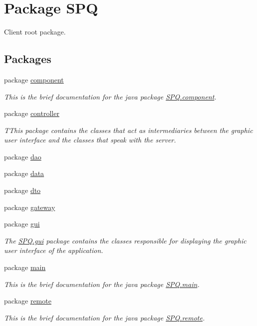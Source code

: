 \hypertarget{namespace_s_p_q}{}\section{Package S\+PQ}
\label{namespace_s_p_q}


Client root package.  


\subsection*{Packages}
\begin{DoxyCompactItemize}
\item 
package \mbox{\hyperlink{namespace_s_p_q_1_1component}{component}}
\begin{DoxyCompactList}\small\item\em This is the brief documentation for the java package \mbox{\hyperlink{namespace_s_p_q_1_1component}{S\+P\+Q.\+component}}. \end{DoxyCompactList}\item 
package \mbox{\hyperlink{namespace_s_p_q_1_1controller}{controller}}
\begin{DoxyCompactList}\small\item\em T\+This package contains the classes that act as intermediaries between the graphic user interface and the classes that speak with the server. \end{DoxyCompactList}\item 
package \mbox{\hyperlink{namespace_s_p_q_1_1dao}{dao}}
\item 
package \mbox{\hyperlink{namespace_s_p_q_1_1data}{data}}
\item 
package \mbox{\hyperlink{namespace_s_p_q_1_1dto}{dto}}
\item 
package \mbox{\hyperlink{namespace_s_p_q_1_1gateway}{gateway}}
\item 
package \mbox{\hyperlink{namespace_s_p_q_1_1gui}{gui}}
\begin{DoxyCompactList}\small\item\em The \mbox{\hyperlink{namespace_s_p_q_1_1gui}{S\+P\+Q.\+gui}} package contains the classes responsible for displaying the graphic user interface of the application. \end{DoxyCompactList}\item 
package \mbox{\hyperlink{namespace_s_p_q_1_1main}{main}}
\begin{DoxyCompactList}\small\item\em This is the brief documentation for the java package \mbox{\hyperlink{namespace_s_p_q_1_1main}{S\+P\+Q.\+main}}. \end{DoxyCompactList}\item 
package \mbox{\hyperlink{namespace_s_p_q_1_1remote}{remote}}
\begin{DoxyCompactList}\small\item\em This is the brief documentation for the java package \mbox{\hyperlink{namespace_s_p_q_1_1remote}{S\+P\+Q.\+remote}}. \end{DoxyCompactList}\end{DoxyCompactItemize}
